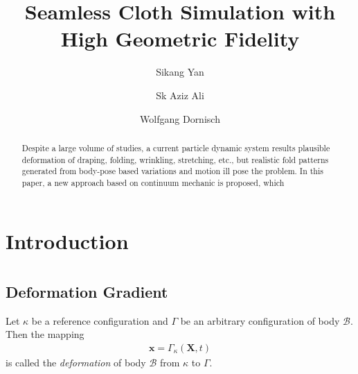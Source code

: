 \documentclass{llncs}
\begin{document}
\pagestyle{headings}  %

%
\title{Seamless Cloth Simulation with High Geometric Fidelity}
%
%
\author{Sikang Yan \and Sk Aziz Ali \and Wolfgang Dornisch}
%
%

\maketitle              %

\begin{abstract}
Despite a large volume of studies, a current particle dynamic system results plausible deformation of draping, folding, wrinkling, stretching, etc., but realistic fold patterns generated from body-pose based variations and motion ill pose the problem. In this paper, a new approach based on continuum mechanic is proposed, which     
\end{abstract}


\section{Introduction}

\section{}
\subsection{Deformation Gradient}
Let $\kappa$ be a reference configuration and $\Gamma$ be an arbitrary configuration of body $\mathcal{B}$. Then the mapping 
 \begin{align}
  \mathbf{x}=\Gamma_{\kappa}( \mathbf{X},t ) 
 \end{align}
is called the \emph{deformation} of body $\mathcal{B}$ from $\kappa$ to $\Gamma$.
\end{document}
